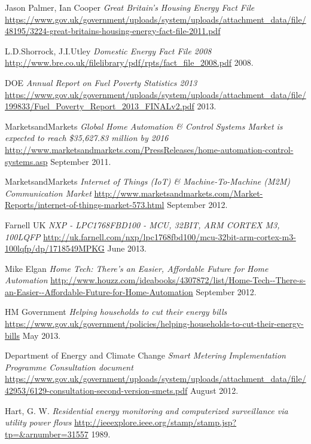 \documentclass[10.5pt,a4paper,twoside]{report}   %
\begin{document}

\begin{thebibliography}{1}
 Jason Palmer, Ian Cooper {\em Great Britain's Housing Energy Fact File} \url{https://www.gov.uk/government/uploads/system/uploads/attachment_data/file/48195/3224-great-britains-housing-energy-fact-file-2011.pdf}

 L.D.Shorrock, J.I.Utley {\em Domestic Energy Fact File 2008} \url{http://www.bre.co.uk/filelibrary/pdf/rpts/fact_file_2008.pdf} 2008.

 DOE {\em Annual Report on Fuel Poverty Statistics 2013} \url{https://www.gov.uk/government/uploads/system/uploads/attachment_data/file/199833/Fuel_Poverty_Report_2013_FINALv2.pdf} 2013.

 MarketsandMarkets {\em Global Home Automation \& Control Systems Market is expected to reach \$35,627.83 million by 2016}  \url{http://www.marketsandmarkets.com/PressReleases/home-automation-control-systems.asp} September 2011.

 MarketsandMarkets {\em Internet of Things (IoT) \& Machine-To-Machine (M2M) Communication Market}  \url{http://www.marketsandmarkets.com/Market-Reports/internet-of-things-market-573.html} September 2012.

 Farnell UK {\em NXP - LPC1768FBD100 - MCU, 32BIT, ARM CORTEX M3, 100LQFP}  \url{http://uk.farnell.com/nxp/lpc1768fbd100/mcu-32bit-arm-cortex-m3-100lqfp/dp/1718549MPKG} June 2013.

 Mike Elgan {\em 
Home Tech: There's an Easier, Affordable Future for Home Automation}  \url{http://www.houzz.com/ideabooks/4307872/list/Home-Tech--There-s-an-Easier--Affordable-Future-for-Home-Automation} September 2012.

 HM Government {\em 
Helping households to cut their energy bills}  \url{https://www.gov.uk/government/policies/helping-households-to-cut-their-energy-bills} May 2013.

 Department of Energy and Climate Change {\em 
Smart Metering Implementation Programme Consultation document}  \url{https://www.gov.uk/government/uploads/system/uploads/attachment_data/file/42953/6129-consultation-second-version-smets.pdf} August 2012.

 Hart, G. W. {\em 
Residential energy monitoring and computerized surveillance via utility power flows}  \url{http://ieeexplore.ieee.org/stamp/stamp.jsp?tp=&arnumber=31557} 1989.


\end{thebibliography}
\end{document}
